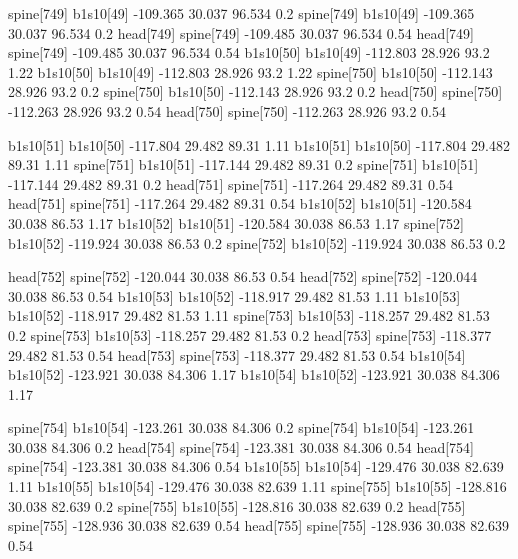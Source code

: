 spine[749]    b1s10[49]    -109.365    30.037    96.534    0.2
spine[749]    b1s10[49]    -109.365    30.037    96.534    0.2
head[749]    spine[749]    -109.485    30.037    96.534    0.54
head[749]    spine[749]    -109.485    30.037    96.534    0.54
b1s10[50]    b1s10[49]    -112.803    28.926    93.2    1.22
b1s10[50]    b1s10[49]    -112.803    28.926    93.2    1.22
spine[750]    b1s10[50]    -112.143    28.926    93.2    0.2
spine[750]    b1s10[50]    -112.143    28.926    93.2    0.2
head[750]    spine[750]    -112.263    28.926    93.2    0.54
head[750]    spine[750]    -112.263    28.926    93.2    0.54


b1s10[51]    b1s10[50]    -117.804    29.482    89.31    1.11
b1s10[51]    b1s10[50]    -117.804    29.482    89.31    1.11
spine[751]    b1s10[51]    -117.144    29.482    89.31    0.2
spine[751]    b1s10[51]    -117.144    29.482    89.31    0.2
head[751]    spine[751]    -117.264    29.482    89.31    0.54
head[751]    spine[751]    -117.264    29.482    89.31    0.54
b1s10[52]    b1s10[51]    -120.584    30.038    86.53    1.17
b1s10[52]    b1s10[51]    -120.584    30.038    86.53    1.17
spine[752]    b1s10[52]    -119.924    30.038    86.53    0.2
spine[752]    b1s10[52]    -119.924    30.038    86.53    0.2


head[752]    spine[752]    -120.044    30.038    86.53    0.54
head[752]    spine[752]    -120.044    30.038    86.53    0.54
b1s10[53]    b1s10[52]    -118.917    29.482    81.53    1.11
b1s10[53]    b1s10[52]    -118.917    29.482    81.53    1.11
spine[753]    b1s10[53]    -118.257    29.482    81.53    0.2
spine[753]    b1s10[53]    -118.257    29.482    81.53    0.2
head[753]    spine[753]    -118.377    29.482    81.53    0.54
head[753]    spine[753]    -118.377    29.482    81.53    0.54
b1s10[54]    b1s10[52]    -123.921    30.038    84.306    1.17
b1s10[54]    b1s10[52]    -123.921    30.038    84.306    1.17


spine[754]    b1s10[54]    -123.261    30.038    84.306    0.2
spine[754]    b1s10[54]    -123.261    30.038    84.306    0.2
head[754]    spine[754]    -123.381    30.038    84.306    0.54
head[754]    spine[754]    -123.381    30.038    84.306    0.54
b1s10[55]    b1s10[54]    -129.476    30.038    82.639    1.11
b1s10[55]    b1s10[54]    -129.476    30.038    82.639    1.11
spine[755]    b1s10[55]    -128.816    30.038    82.639    0.2
spine[755]    b1s10[55]    -128.816    30.038    82.639    0.2
head[755]    spine[755]    -128.936    30.038    82.639    0.54
head[755]    spine[755]    -128.936    30.038    82.639    0.54



